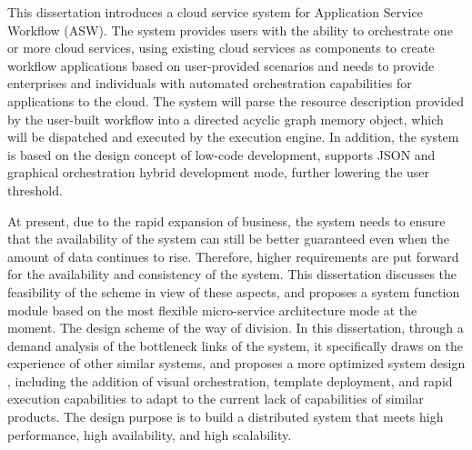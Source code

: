 \begin{abstract*}
  This dissertation introduces a cloud service system for Application Service Workflow (ASW).
  The system provides users with the ability to orchestrate one or more cloud services,
  using existing cloud services as components to create workflow applications based on user-provided scenarios and needs
  to provide enterprises and individuals with automated orchestration capabilities for applications to the cloud.
  The system will parse the resource description provided by the user-built workflow into a directed
  acyclic graph memory object, which will be dispatched and executed by the execution engine.
  In addition, the system is based on the design concept of low-code development,
  supports JSON and graphical orchestration hybrid development mode\cite{othe4}, further lowering the user threshold.

  At present, due to the rapid expansion of business, the system needs to ensure that the availability of the system can
  still be better guaranteed even when the amount of data continues to rise.
  Therefore, higher requirements are put forward for the availability and consistency of the system.
  This dissertation discusses the feasibility of the scheme in view of these aspects,
  and proposes a system function module based on the most flexible micro-service architecture mode at the moment.
  The design scheme of the way of division.
  In this dissertation, through a demand analysis of the bottleneck links of the system, it specifically draws on the experience
  of other similar systems, and proposes a more optimized system design \cite{othe3},
  including the addition of visual orchestration, template deployment, and rapid execution capabilities to adapt to the
  current lack of capabilities of similar products.
  The design purpose is to build a distributed system that meets high performance, high availability, and high scalability.

\end{abstract*}
